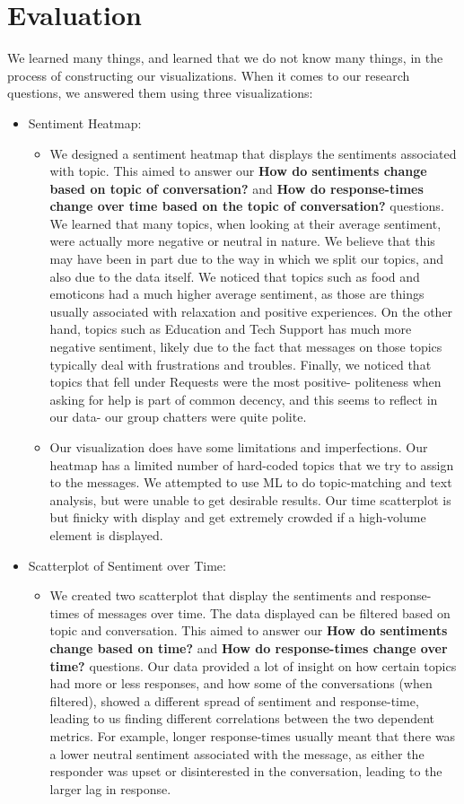 \documentclass{article}\usepackage{graphicx}
\begin{document}
\section{Evaluation}
We learned many things, and learned that we do not know many things, in the process of constructing our visualizations. When it comes to our research questions, we answered them using three visualizations:
\begin{itemize}
    \item Sentiment Heatmap: 
    \begin{itemize}
        \item We designed a sentiment heatmap that displays the sentiments associated with topic. This aimed to answer our \textbf{How do sentiments change based on topic of conversation?} and \textbf{How do response-times change over time based on the topic of conversation?} questions. We learned that many topics, when looking at their average sentiment, were actually more negative or neutral in nature. We believe that this may have been in part due to the way in which we split our topics, and also due to the data itself. We noticed that topics such as food and emoticons had a much higher average sentiment, as those are things usually associated with relaxation and positive experiences. On the other hand, topics such as Education and Tech Support has much more negative sentiment, likely due to the fact that messages on those topics typically deal with frustrations and troubles. Finally, we noticed that topics that fell under Requests were the most positive- politeness when asking for help is part of common decency, and this seems to reflect in our data- our group chatters were quite polite.
        \item Our visualization does have some limitations and imperfections. Our heatmap has a limited number of hard-coded topics that we try to assign to the messages. We attempted to use ML to do topic-matching and text analysis, but were unable to get desirable results. Our time scatterplot is but finicky with display and get extremely crowded if a high-volume element is displayed.   
    \end{itemize}
    \item Scatterplot of Sentiment over Time:
    \begin{itemize}
        \item We created two scatterplot that display the sentiments and response-times of messages over time. The data displayed can be filtered based on topic and conversation. This aimed to answer our \textbf{How do sentiments change based on time?} and \textbf{How do response-times change over time?} questions. Our data provided a lot of insight on how certain topics had more or less responses, and how some of the conversations (when filtered), showed a different spread of sentiment and response-time, leading to us finding different correlations between the two dependent metrics. For example, longer response-times usually meant that there was a lower neutral sentiment associated with the message, as either the responder was upset or disinterested in the conversation, leading to the larger lag in response. 

\end{itemize}
\end{itemize}
\end{document}
